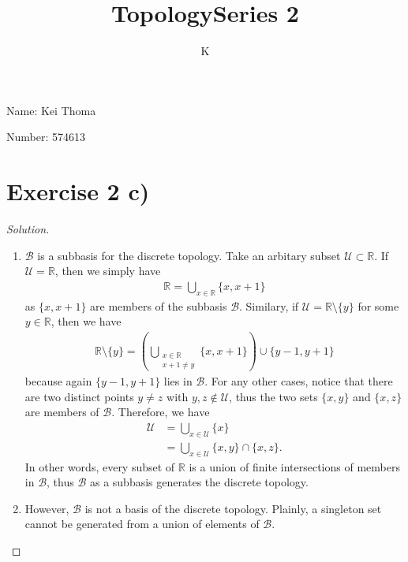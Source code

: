 \documentclass[a4paper]{article}
\title{Topology}
\author{K}
\title{Series 2}
\theoremstyle{definition}
\begin{document}
\maketitle
Name: Kei Thoma

Number: 574613

\section*{Exercise 2 c)}

\begin{proof}[Solution]
    \begin{enumerate}
        \item \(\mathcal{B}\) is a subbasis for the discrete topology. Take an arbitary subset \(\mathcal{U} \subset \mathbb{R}\). If \(\mathcal{U} = \mathbb{R}\), then we simply have
        \begin{align*}
            \mathbb{R} = \bigcup_{x \in \mathbb{R}} \{x, x + 1\}
        \end{align*}
        as \(\{x, x + 1\}\) are members of the subbasis \(\mathcal{B}\). Similary, if \(\mathcal{U} = \mathbb{R} \setminus \{y\}\) for some \(y \in \mathbb{R}\), then we have
        \begin{align*}
            \mathbb{R} \setminus \{y\} = \left( \bigcup_{\substack{x \in \mathbb{R} \\ x + 1 \neq y}} \{x, x + 1\} \right) \cup \{y - 1, y + 1\}
        \end{align*}
        because again \(\{y - 1, y + 1\}\) lies in \(\mathcal{B}\). For any other cases, notice that there are two distinct points \(y \neq z\) with \(y, z \not\in \mathcal{U}\), thus the two sets \(\{x, y\}\) and \(\{x, z\}\) are members of \(\mathcal{B}\). Therefore, we have
        \begin{align*}
            \mathcal{U} &= \bigcup_{x \in \mathcal{U}} \{x\} \\
            &= \bigcup_{x \in \mathcal{U}} \{x, y\} \cap \{x, z\} \text{.}
        \end{align*}
        In other words, every subset of \(\mathbb{R}\) is a union of finite intersections of members in \(\mathcal{B}\), thus \(\mathcal{B}\) as a subbasis generates the discrete topology.
        \item However, \(\mathcal{B}\) is not a basis of the discrete topology. Plainly, a singleton set cannot be generated from a union of elements of \(\mathcal{B}\).
    \end{enumerate}
\end{proof}
\end{document}
